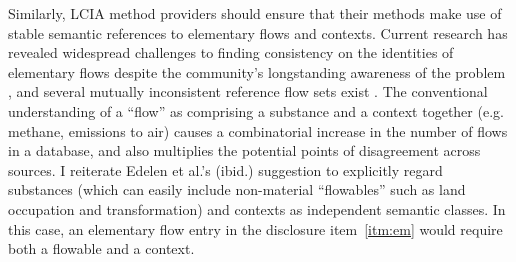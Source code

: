 Similarly, LCIA method providers should ensure that their methods make use of stable semantic references to elementary flows and contexts.  Current research has revealed widespread challenges to finding consistency on the identities of elementary flows despite the community's longstanding awareness of the problem \citep{Speck_2015,Herrmann_2015}, and several mutually inconsistent reference flow sets exist \citep{Edelen_2017}.  The conventional understanding of a ``flow'' as comprising a substance and a context together (e.g. methane, emissions to air) causes a combinatorial increase in the number of flows in a database, and also multiplies the potential points of disagreement across sources.  I reiterate Edelen et al.'s (ibid.) suggestion to explicitly regard substances (which can easily include non-material ``flowables'' such as land occupation and transformation) and contexts as independent semantic classes.  In this case, an elementary flow entry in the disclosure item~\ref{itm:em} would require both a flowable and a context.

\endinput

It is necessary for the entries in disclosure items~\ref{itm:bg} and \ref{itm:em} to be unambiguous and easy to interpret.  Entries in \ref{itm:bg}, which represent rows in $A_d$, must clearly identify the originating database, version, and configuration, along with the precise dataset, that dataset's reference flow, and the dimension (reference quantity or unit) of that flow.  In addition, the sign of the numeric entry in $A_d$ must be consistent with the implementation of the background dataset.  Similar requirements also hold for entries in \ref{itm:em}, which represent rows in $B_f$.
